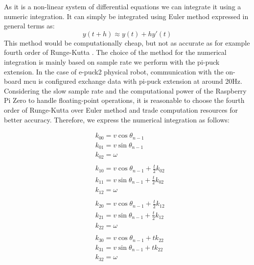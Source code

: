 As it is a non-linear system of differential equations we can integrate it using a numeric integration.
It can simply be integrated using Euler method expressed in general terms as:
\begin{equation}
    y(t + h) \approx y(t) + h y'(t)
\end{equation}
This method would be computationally cheap, but not as accurate as for example fourth order of Runge-Kutta \cite[p. 40]{noauthor_solving_1993}.
The choice of the method for the numerical integration is mainly based on sample rate we perform with the pi-puck extension.
In the case of e-puck2 physical robot, communication with the on-board \ac{mcu} is configured exchange data with pi-puck extension at around 20Hz.
Considering the slow sample rate and the computational power of the Raspberry Pi Zero to handle floating-point operations, it is reasonable to choose the fourth order of Runge-Kutta over Euler method and trade computation resources for better accuracy.
Therefore, we express the numerical integration as follows:


\begin{equation}
\begin{aligned}
    & k_{00} = v \cos{\theta_{n-1}} \\
    & k_{01} = v \sin{\theta_{n-1}} \\
    & k_{02} = \omega \\
    & \\
    & k_{10} = v \cos{\theta_{n-1} + \frac{t}{2}k_{02}} \\
    & k_{11} = v \sin{\theta_{n-1} + \frac{t}{2}k_{02}} \\
    & k_{12} = \omega \\
    & \\
    & k_{20} = v \cos{\theta_{n-1} + \frac{t}{2}k_{12}} \\
    & k_{21} = v \sin{\theta_{n-1} + \frac{t}{2}k_{12}} \\
    & k_{22} = \omega \\
    & \\
    & k_{30} = v \cos{\theta_{n-1} + t k_{22}} \\
    & k_{31} = v \sin{\theta_{n-1} + t k_{22}} \\
    & k_{32} = \omega
\end{aligned}
\end{equation}

